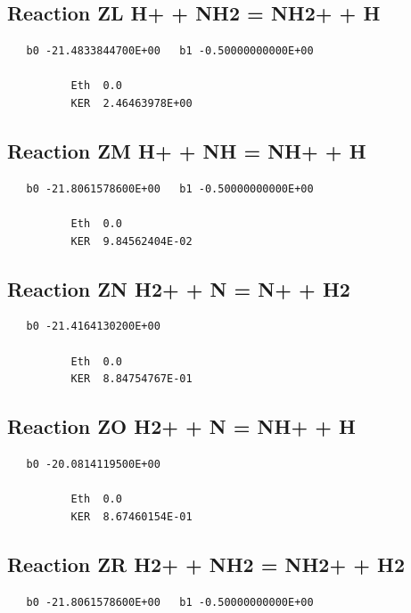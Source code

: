\documentclass[12pt]{article}
\begin{document}
\subsection{
Reaction ZL H+ + NH2 = NH2+ + H }
\begin{small}\begin{verbatim}
   b0 -21.4833844700E+00   b1 -0.50000000000E+00

          Eth  0.0
          KER  2.46463978E+00

\end{verbatim}\end{small}
\newpage

\subsection{
Reaction ZM H+ + NH = NH+ + H }
\begin{small}\begin{verbatim}
   b0 -21.8061578600E+00   b1 -0.50000000000E+00

          Eth  0.0
          KER  9.84562404E-02

\end{verbatim}\end{small}
\newpage

\subsection{
Reaction ZN H2+ + N = N+ + H2 }
\begin{small}\begin{verbatim}
   b0 -21.4164130200E+00

          Eth  0.0
          KER  8.84754767E-01

\end{verbatim}\end{small}
\newpage

\subsection{
Reaction ZO H2+ + N = NH+ + H }
\begin{small}\begin{verbatim}
   b0 -20.0814119500E+00

          Eth  0.0
          KER  8.67460154E-01

\end{verbatim}\end{small}
\newpage

\subsection{
Reaction ZR H2+ + NH2 = NH2+ + H2 }
\begin{small}\begin{verbatim}
   b0 -21.8061578600E+00   b1 -0.50000000000E+00
\end{verbatim}\end{small}
\newpage
\end{document}
